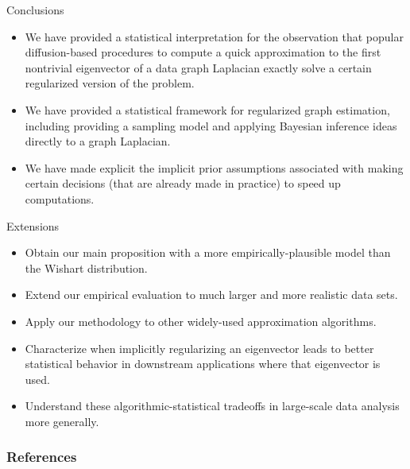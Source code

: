 \documentclass[xcolor=dvipsnames]{beamer}
\begin{document}
\begin{frame}[c]
  \begin{block}{}
  \begin{center}
    \huge{Conclusions}
  \end{center}
  \end{block}

\begin{itemize}
\item
We have
provided a statistical interpretation for the observation that popular 
diffusion-based procedures to compute a quick approximation to the first 
nontrivial eigenvector of a data graph Laplacian exactly solve a certain 
regularized version of the problem.
\item
We have
provided a statistical framework for regularized graph estimation, 
including providing a sampling model and applying Bayesian inference 
ideas directly to a graph Laplacian.
\item
We have
made explicit the implicit prior assumptions associated with making 
certain decisions (that are already made in practice) to speed up 
computations.
\end{itemize}

\end{frame}

\begin{frame}[c]
  \begin{block}{}
  \begin{center}
    \huge{Extensions}
  \end{center}
  \end{block}

\begin{itemize}
\item
Obtain our main proposition with a more empirically-plausible model than the 
Wishart distribution.
\item
Extend our empirical evaluation to much larger and more realistic data sets.
\item
Apply our methodology to other widely-used approximation algorithms.
\item
Characterize when implicitly regularizing an eigenvector leads to better 
statistical behavior in downstream applications where that eigenvector is 
used.  
\item
Understand these algorithmic-statistical tradeoffs in large-scale data 
analysis more generally.
\end{itemize}
\end{frame}


\begin{frame}
  \frametitle{References}
  
  \footnotesize{
    
  }
\end{frame}
\end{document}
